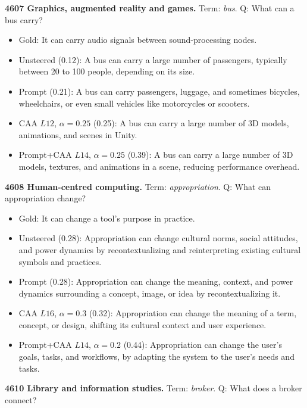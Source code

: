 \medskip\noindent\textbf{4607 Graphics, augmented reality and games.} Term: \emph{bus}.
Q: What can a bus carry?
\begin{itemize}\setlength{\itemsep}{0.15em}\setlength{\parsep}{0pt}\setlength{\topsep}{0.2em}
\item Gold: It can carry audio signals between sound-processing nodes.
\item Unsteered (0.12): A bus can carry a large number of passengers, typically between 20 to 100 people, depending on its size.
\item Prompt (0.21): A bus can carry passengers, luggage, and sometimes bicycles, wheelchairs, or even small vehicles like motorcycles or scooters.
\item CAA $L12$, $\alpha=0.25$ (0.25): A bus can carry a large number of 3D models, animations, and scenes in Unity.
\item Prompt+CAA $L14$, $\alpha=0.25$ (0.39): A bus can carry a large number of 3D models, textures, and animations in a scene, reducing performance overhead.
\end{itemize}
\medskip\noindent\textbf{4608 Human-centred computing.} Term: \emph{appropriation}.
Q: What can appropriation change?
\begin{itemize}\setlength{\itemsep}{0.15em}\setlength{\parsep}{0pt}\setlength{\topsep}{0.2em}
\item Gold: It can change a tool's purpose in practice.
\item Unsteered (0.28): Appropriation can change cultural norms, social attitudes, and power dynamics by recontextualizing and reinterpreting existing cultural symbols and practices.
\item Prompt (0.28): Appropriation can change the meaning, context, and power dynamics surrounding a concept, image, or idea by recontextualizing it.
\item CAA $L16$, $\alpha=0.3$ (0.32): Appropriation can change the meaning of a term, concept, or design, shifting its cultural context and user experience.
\item Prompt+CAA $L14$, $\alpha=0.2$ (0.44): Appropriation can change the user's goals, tasks, and workflows, by adapting the system to the user's needs and tasks.
\end{itemize}
\medskip\noindent\textbf{4610 Library and information studies.} Term: \emph{broker}.
Q: What does a broker connect?
